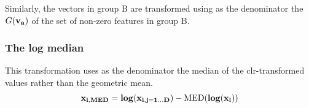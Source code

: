 \documentclass{bmcart}
\begin{document}
Similarly, the vectors in group B are transformed using as the denominator the $G(\mathit{\bf{v}_a})$ of the set of non-zero features in group B. 


\subsubsection*{The log median}

This transformation uses as the denominator the median of the clr-transformed values rather than the geometric mean. 
\begin{equation}
\bf{x}_{i,MED} = log({x_{i,j=1 \dots D}}) - \mathrm{MED}(log(x_i))
\label{eq:iqlr}
\end{equation}

\end{document}
